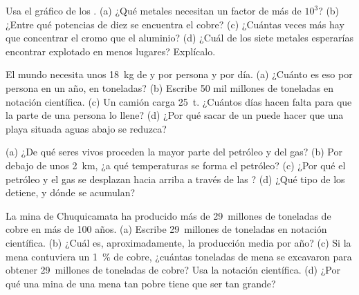 \begin{exercise}[$\star\star$]\label{exo:g9:earth-resources:7}
Usa el gráfico de los . (a) ¿Qué metales
necesitan un factor de más de $10^3$? (b) ¿Entre qué potencias de diez se
encuentra el cobre? (c) ¿Cuántas veces más hay que concentrar el cromo que
el aluminio? (d) ¿Cuál de los siete metales esperarías encontrar explotado
en menos lugares? Explícalo.
\end{exercise}

\begin{exercise}[$\star\star$]\label{exo:g9:earth-resources:8}
El mundo necesita unos \qty{18}{kg} de  y  por persona y por
día. (a) ¿Cuánto es eso por persona en un año, en toneladas? (b) Escribe
50 mil millones de toneladas en notación científica. (c) Un camión carga
\qty{25}{t}. ¿Cuántos días hacen falta para que la parte de una persona lo
llene? (d) ¿Por qué sacar  de un  puede hacer que una playa
situada aguas abajo se reduzca?
\end{exercise}

\begin{exercise}[$\star\star$]\label{exo:g9:earth-resources:9}
(a) ¿De qué seres vivos proceden la mayor parte del petróleo y del gas?
(b) Por debajo de unos \qty{2}{km}, ¿a qué temperaturas se forma el
petróleo? (c) ¿Por qué el petróleo y el gas se desplazan hacia arriba a
través de las ? (d) ¿Qué tipo de  los detiene, y dónde se
acumulan?
\end{exercise}

\begin{exercise}[$\star\star$]\label{exo:g9:earth-resources:10}
La mina de Chuquicamata ha producido más de 29~millones de toneladas de
cobre en más de 100 años. (a) Escribe 29~millones de toneladas en notación
científica. (b) ¿Cuál es, aproximadamente, la producción media por año?
(c) Si la mena contuviera un \qty{1}{\%} de cobre, ¿cuántas toneladas de
mena se excavaron para obtener 29~millones de toneladas de cobre? Usa la
notación científica. (d) ¿Por qué una mina de una mena tan pobre tiene que
ser tan grande?
\end{exercise}

